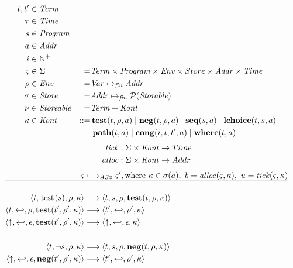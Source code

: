 \documentclass{article}
\begin{document}
{\newcommand{\tick}{\ensuremath \mathit{tick}}
\newcommand{\alloc}{\ensuremath \mathit{alloc}}

\begin{alignat*}{2}
  t, t' &\in \mathit{Term} && \\
  \tau &\in \mathit{Time} && \\
  s &\in \mathit{Program} && \\
  a &\in \mathit{Addr} && \\
  i &\in \mathbb{N}^+ && \\
  \varsigma &\in \Sigma &=& \mathit{Term} \times \mathit{Program} \times \mathit{Env} \times Store \times \mathit{Addr} \times \mathit{Time} \\
  \rho &\in \mathit{Env} &=& \mathit{Var} \mapsto_{\mathit{fin}} \mathit{Addr} \\
  \sigma &\in \mathit{Store} &=& \mathit{Addr} \mapsto_{\mathit{fin}} \mathcal{P}(\mathit{Storable}) \\
  \nu &\in \mathit{Storeable} &=& \mathit{Term} + \mathit{Kont} \\
  \kappa &\in \mathit{Kont} &::=&\, \mathbf{test}(t,\rho,a) \; | \; \mathbf{neg}(t,\rho,a) \; | \; \mathbf{seq}(s,a) \; | \; \mathbf{lchoice}(t,s,a) \\
  &&|&\; \mathbf{path}(t,a) \; | \; \mathbf{cong}(i,t,t',a) \; | \; \mathbf{where}(t,a)
\end{alignat*}
%
\begin{align*}
  \tick &: \Sigma \times \mathit{Kont} \rightarrow Time \\
  \alloc &: \Sigma \times \mathit{Kont} \rightarrow Addr
\end{align*}
%
\begin{align*}
  \varsigma & \longmapsto_{\mathit{AS2}} \varsigma', \text{where } \kappa \in \sigma(a),\ b = \alloc(\varsigma,\kappa),\ u = \tick(\varsigma,\kappa) \\
  \hline & \\
  \transition{t,\test{s},\rho,\kappa}{t,s,\rho, \cont{test}{t,\rho,\kappa}} \\
  \transition{t,\return,\rho,\cont{test}{t',\rho',\kappa}}{t',\return,\rho',\kappa} \\
  \transition{\fail,\return,\epsilon,\cont{test}{t',\rho',\kappa}}{\fail,\return,\epsilon,\kappa} \\
  \notag \\
  \transition{t,\neg s,\rho,\kappa}{t,s,\rho,\cont{neg}{t,\rho,\kappa}} \\
  \transition{\fail,\return,\epsilon,\cont{neg}{t',\rho',\kappa}}{t',\return,\rho',\kappa} \\

\end{align*}}
\end{document}
